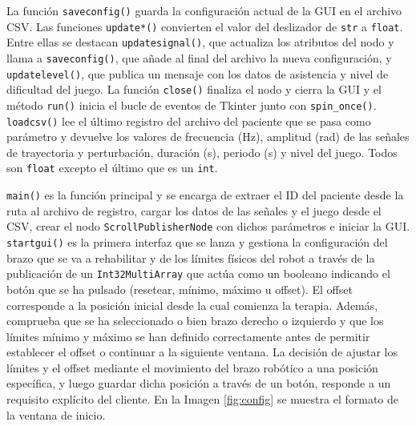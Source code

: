 La función \verb|saveconfig()| guarda la configuración actual de la GUI en el archivo CSV.
Las funciones \verb|update*()| convierten el valor del deslizador de \verb|str| a \verb|float|.
Entre ellas se destacan \verb|updatesignal()|, que actualiza los atributos del nodo y llama a \verb|saveconfig()|, que añade al final del archivo la nueva configuración, y \verb|updatelevel()|, que publica un mensaje con los datos de asistencia y nivel de dificultad del juego.
La función \verb|close()| finaliza el nodo y cierra la GUI y el método \verb|run()| inicia el bucle de eventos de Tkinter junto con \verb|spin_once()|.
\verb|loadcsv()| lee el último registro del archivo del paciente que se pasa como parámetro y devuelve los valores de frecuencia (Hz), amplitud (rad) de las señales de trayectoria y perturbación, duración (s), periodo (s) y nivel del juego.
Todos son \verb|float| excepto el último que es un \verb|int|.

\verb|main()| es la función principal y se encarga de extraer el ID del paciente desde la ruta al archivo de registro, cargar los datos de las señales y el juego desde el CSV, crear el nodo \verb|ScrollPublisherNode| con dichos parámetros e iniciar la GUI.
\verb|startgui()| es la primera interfaz que se lanza y gestiona la configuración del brazo que se va a rehabilitar y de los límites físicos del robot a través de la publicación de un \verb|Int32MultiArray| que actúa como un booleano indicando el botón que se ha pulsado (resetear, mínimo, máximo u offset).
El offset corresponde a la posición inicial desde la cual comienza la terapia.
Además, comprueba que se ha seleccionado o bien brazo derecho o izquierdo y que los límites mínimo y máximo se han definido correctamente antes de permitir establecer el offset o continuar a la siguiente ventana.
La decisión de ajustar los límites y el offset mediante el movimiento del brazo robótico a una posición específica, y luego guardar dicha posición a través de un botón, responde a un requisito explícito del cliente.
En la Imagen \ref{fig:config} se muestra el formato de la ventana de inicio.

